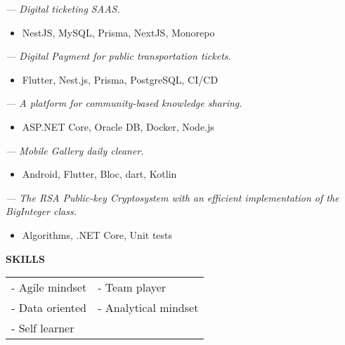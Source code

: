 

 \textit{\small— Digital ticketing SAAS.}
\smallskip
\begin{itemize}
	\item NestJS, MySQL, Prisma, NextJS, Monorepo
\end{itemize}

\smallskip

 \textit{\small— Digital Payment for public transportation tickets.}
\smallskip
\begin{itemize}
	\item Flutter, Nest.js, Prisma, PostgreSQL, CI/CD
\end{itemize}

\smallskip

\smallskip
{} \textit{\small— A platform for community-based knowledge sharing.}
\smallskip
\begin{itemize}
	\item ASP.NET Core, Oracle DB, Docker, Node.js
\end{itemize}

\medskip
{} \textit{\small— Mobile Gallery daily cleaner.}
\smallskip
\begin{itemize}
	\item Android, Flutter, Bloc, dart, Kotlin
\end{itemize}

\medskip
{} \textit{\small— The RSA Public-key Cryptosystem with an efficient implementation of the BigInteger class.}
\smallskip
\begin{itemize}
	\item Algorithms, .NET Core, Unit tests
\end{itemize}


\textcolor{VividPurple}{\textbf{SKILLS}}
\medskip

\begin{tabular}{ l l } 
	- Agile mindset & - Team player        \\
	- Data oriented & - Analytical mindset \\
	- Self learner                          \\
\end{tabular}

